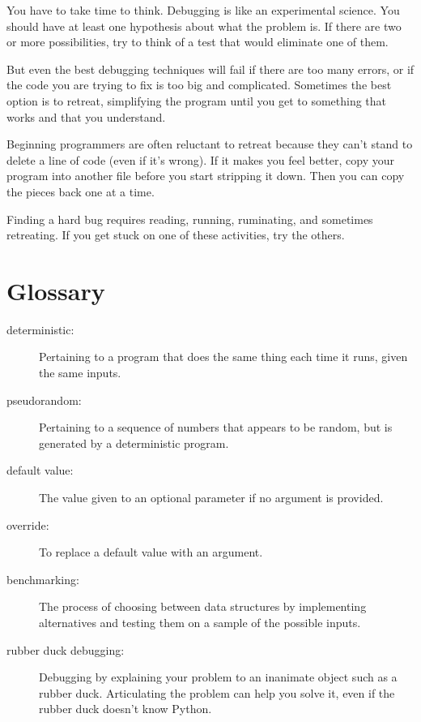 \documentclass[10pt]{book}
\begin{document}
You have to take time to think.  Debugging is like an
experimental science.  You should have at least one hypothesis about
what the problem is.  If there are two or more possibilities, try to
think of a test that would eliminate one of them.

But even the best debugging techniques will fail if there are too many
errors, or if the code you are trying to fix is too big and
complicated.  Sometimes the best option is to retreat, simplifying the
program until you get to something that works and that you
understand.

Beginning programmers are often reluctant to retreat because
they can't stand to delete a line of code (even if it's wrong).
If it makes you feel better, copy your program into another file
before you start stripping it down.  Then you can copy the pieces
back one at a time.

Finding a hard bug requires reading, running, ruminating, and
sometimes retreating.  If you get stuck on one of these activities,
try the others.


\section{Glossary}

\begin{description}

\item[deterministic:] Pertaining to a program that does the same
thing each time it runs, given the same inputs.

\item[pseudorandom:] Pertaining to a sequence of numbers that appears
to be random, but is generated by a deterministic program.

\item[default value:] The value given to an optional parameter if no
argument is provided.

\item[override:] To replace a default value with an argument.

\item[benchmarking:] The process of choosing between data structures
by implementing alternatives and testing them on a sample of the
possible inputs.  

\item[rubber duck debugging:] Debugging by explaining your problem
to an inanimate object such as a rubber duck.  Articulating the
problem can help you solve it, even if the rubber duck doesn't know
Python. 

\end{description}
\end{document}
